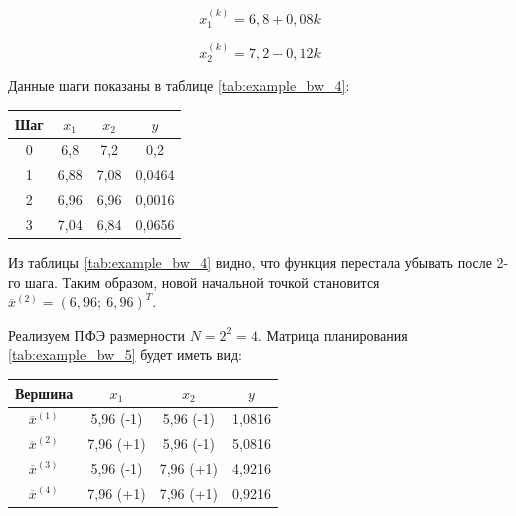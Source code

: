 \documentclass[a4paper,12pt]{report}
\begin{document}
\begin{equation*}
x^{(k)}_{1} = 6,8 + 0,08k
\end{equation*}

\begin{equation*}
x^{(k)}_{2} = 7,2 - 0,12k
\end{equation*}

Данные шаги показаны в таблице \ref{tab:example_bw_4}:

\begin{center}
  \captionsetup{justification=raggedleft}
  \label{tab:example_bw_4}
  \begin{tabular}{|c|c|c|c|}
    \hline
    Шаг & $x_{1}$ & $x_{2}$ & $y$\\
    \hline
    0 & 6,8 & 7,2 & 0,2\\
    \hline
    1 & 6,88 & 7,08 & 0,0464\\
    \hline
    2 & 6,96 & 6,96 & 0,0016\\
    \hline
    3 & 7,04 & 6,84 & 0,0656\\
    \hline
  \end{tabular}
\end{center}

Из таблицы \ref{tab:example_bw_4} видно, что функция перестала убывать после 2-го шага. Таким образом, новой начальной точкой становится $\overline{x}^{(2)} = (6,96;\ 6,96)^{T}$.

Реализуем ПФЭ размерности $N = 2^{2} = 4$. Матрица планирования \ref{tab:example_bw_5} будет иметь вид:

\begin{center}
  \captionsetup{justification=raggedleft}
  \label{tab:example_bw_5}
  \begin{tabular}{|c|c|c|c|}
    \hline
    Вершина & $x_{1}$ & $x_{2}$ & $y$\\
    \hline
    $\overline{x}^{(1)}$ & 5,96 (-1) & 5,96 (-1) & 1,0816\\
    \hline
    $\overline{x}^{(2)}$ & 7,96 (+1) & 5,96 (-1) & 5,0816\\
    \hline
    $\overline{x}^{(3)}$ & 5,96 (-1) & 7,96 (+1) & 4,9216\\
    \hline
    $\overline{x}^{(4)}$ & 7,96 (+1) & 7,96 (+1) & 0,9216\\
    \hline
  \end{tabular}
\end{center}
\end{document}

